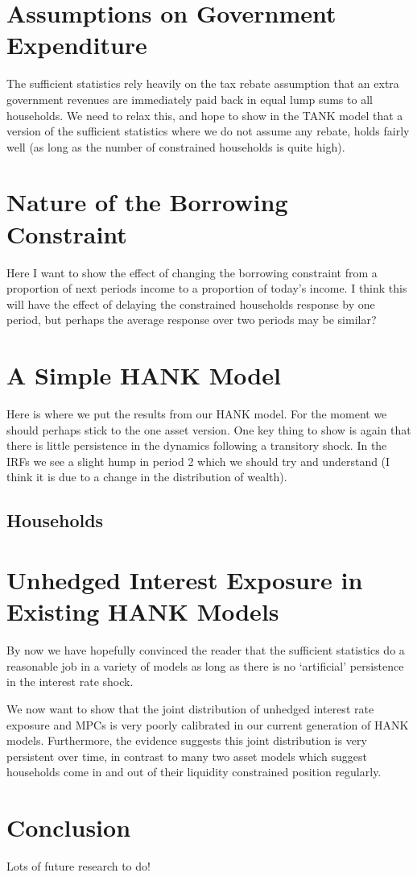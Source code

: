 \documentclass[titlepage]{\econtex}\newcommand{\texname}{ConsumptionHeterogeneity}
\begin{document}
\section{Assumptions on Government Expenditure}
The sufficient statistics rely heavily on the tax rebate assumption that an extra government revenues are immediately paid back in equal lump sums to all households. We need to relax this, and hope to show in the TANK model that a version of the sufficient statistics where we do not assume any rebate, holds fairly well (as long as the number of constrained households is quite high).

\section{Nature of the Borrowing Constraint}
Here I want to show the effect of changing the borrowing constraint from a proportion of next periods income to a proportion of today's income. I think this will have the effect of delaying the constrained households response by one period, but perhaps the average response over two periods may be similar?

\section{A Simple HANK Model}
Here is where we put the results from our HANK model. For the moment we should perhaps stick to the one asset version. One key thing to show is again that there is little persistence in the dynamics following a transitory shock. In the IRFs we see a slight hump in period 2 which we should try and understand (I think it is due to a change in the distribution of wealth).

\subsection{Households}

\section{Unhedged Interest Exposure in Existing HANK Models}
By now we have hopefully convinced the reader that the sufficient statistics do a reasonable job in a variety of models as long as there is no `artificial' persistence in the interest rate shock.

We now want to show that the joint distribution of unhedged interest rate exposure and MPCs is very poorly calibrated in our current generation of HANK models. Furthermore, the evidence suggests this joint distribution is very persistent over time, in contrast to many two asset models which suggest households come in and out of their liquidity constrained position regularly.


\section{Conclusion}
Lots of future research to do!



\small

\normalsize
\end{document}
